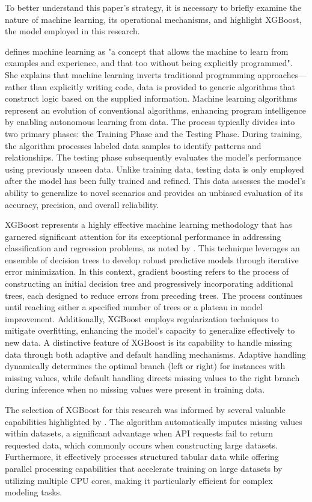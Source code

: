 To better understand this paper's strategy, it is necessary to briefly examine the nature of machine learning, its operational mechanisms, and highlight XGBoost, the model employed in this research.

\textcite{Johari2018MachineExamples} defines machine learning as "a concept that allows the machine to learn from examples and experience, and that too without being explicitly programmed". She explains that machine learning inverts traditional programming approaches—rather than explicitly writing code, data is provided to generic algorithms that construct logic based on the supplied information. Machine learning algorithms represent an evolution of conventional algorithms, enhancing program intelligence by enabling autonomous learning from data. The process typically divides into two primary phases: the Training Phase and the Testing Phase. During training, the algorithm processes labeled data samples to identify patterns and relationships. The testing phase subsequently evaluates the model's performance using previously unseen data. Unlike training data, testing data is only employed after the model has been fully trained and refined. This data assesses the model's ability to generalize to novel scenarios and provides an unbiased evaluation of its accuracy, precision, and overall reliability.

XGBoost represents a highly effective machine learning methodology that has garnered significant attention for its exceptional performance in addressing classification and regression problems, as noted by \textcite{harrison2023}. This technique leverages an ensemble of decision trees to develop robust predictive models through iterative error minimization. In this context, gradient boosting refers to the process of constructing an initial decision tree and progressively incorporating additional trees, each designed to reduce errors from preceding trees. The process continues until reaching either a specified number of trees or a plateau in model improvement. Additionally, XGBoost employs regularization techniques to mitigate overfitting, enhancing the model's capacity to generalize effectively to new data. A distinctive feature of XGBoost is its capability to handle missing data through both adaptive and default handling mechanisms. Adaptive handling dynamically determines the optimal branch (left or right) for instances with missing values, while default handling directs missing values to the right branch during inference when no missing values were present in training data.

The selection of XGBoost for this research was informed by several valuable capabilities highlighted by \textcite{harrison2023}. The algorithm automatically imputes missing values within datasets, a significant advantage when API requests fail to return requested data, which commonly occurs when constructing large datasets. Furthermore, it effectively processes structured tabular data while offering parallel processing capabilities that accelerate training on large datasets by utilizing multiple CPU cores, making it particularly efficient for complex modeling tasks.